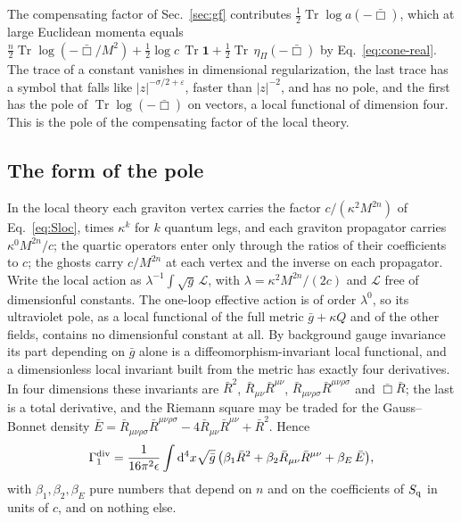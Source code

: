\documentclass[a4paper,11pt]{article}
\newcommand{\dd}{\mathrm{d}}
\newcommand{\Tr}{\operatorname{Tr}}
\begin{document}
The compensating factor of Sec.~\ref{sec:gf} contributes $\frac12\Tr\log a(-\bar\Box)$, which at large Euclidean momenta equals $\frac n2\Tr\log(-\bar\Box/M^2)+\frac12\log c\,\Tr\mathbf 1+\frac12\Tr\,\eta_\Pi(-\bar\Box)$ by Eq.~\eqref{eq:cone-real}. The trace of a constant vanishes in dimensional regularization, the last trace has a symbol that falls like $|z|^{-\sigma/2+\varepsilon}$, faster than $|z|^{-2}$, and has no pole, and the first has the pole of $\Tr\log(-\bar\Box)$ on vectors, a local functional of dimension four. This is the pole of the compensating factor of the local theory.

\subsection{The form of the pole}
\label{sec:form}

In the local theory each graviton vertex carries the factor $c/(\kappa^2M^{2n})$ of Eq.~\eqref{eq:Sloc}, times $\kappa^k$ for $k$ quantum legs, and each graviton propagator carries $\kappa^0M^{2n}/c$; the quartic operators enter only through the ratios of their coefficients to $c$; the ghosts carry $c/M^{2n}$ at each vertex and the inverse on each propagator. Write the local action as $\lambda^{-1}\int\sqrt g\,\mathcal L$, with $\lambda=\kappa^2M^{2n}/(2c)$ and $\mathcal L$ free of dimensionful constants. The one-loop effective action is of order $\lambda^0$, so its ultraviolet pole, as a local functional of the full metric $\bar g+\kappa Q$ and of the other fields, contains no dimensionful constant at all. By background gauge invariance~\cite{Abbott1981,BarvinskyVilkovisky1985} its part depending on $\bar g$ alone is a diffeomorphism-invariant local functional, and a dimensionless local invariant built from the metric has exactly four derivatives. In four dimensions these invariants are $\bar R^2$, $\bar R_{\mu\nu}\bar R^{\mu\nu}$, $\bar R_{\mu\nu\rho\sigma}\bar R^{\mu\nu\rho\sigma}$ and $\bar\Box\bar R$; the last is a total derivative, and the Riemann square may be traded for the Gauss--Bonnet density $\bar E=\bar R_{\mu\nu\rho\sigma}\bar R^{\mu\nu\rho\sigma}-4\bar R_{\mu\nu}\bar R^{\mu\nu}+\bar R^2$. Hence
\begin{equation}
\label{eq:Gamma1}
\Gamma_1^{\rm div}=\frac{1}{16\pi^2\epsilon}\int\dd^4x\sqrt{\bar g}\,\bigl(\beta_1\bar R^2+\beta_2\bar R_{\mu\nu}\bar R^{\mu\nu}+\beta_E\,\bar E\bigr),
\end{equation}
with $\beta_1,\beta_2,\beta_E$ pure numbers that depend on $n$ and on the coefficients of $S_{\rm q}$ in units of $c$, and on nothing else.
\end{document}
